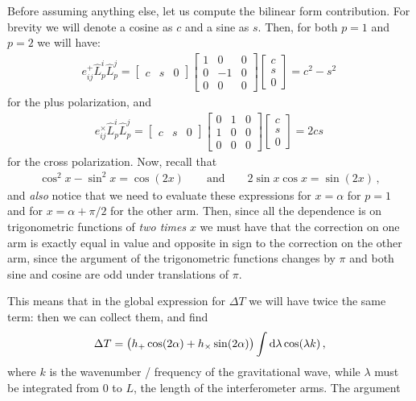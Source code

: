 \documentclass[main.tex]{subfiles}
\begin{document}
Before assuming anything else, let us compute the bilinear form contribution. For brevity we will denote a cosine as \(c\) and a sine as \(s\). Then, for both \(p =1\) and \(p=2\) we will have: 
%
\begin{align}
e_{ij}^{+} \hat{L}^{i}_{p} \hat{L}^{j}_p 
= \left[\begin{array}{ccc}
c & s & 0
\end{array}\right] 
\left[\begin{array}{ccc}
1 & 0 & 0 \\ 
0 & -1 & 0 \\ 
0 & 0 & 0
\end{array}\right] 
\left[\begin{array}{c}
c \\ 
s \\ 
0
\end{array}\right]= c^2- s^2 
\,
\end{align}
%
for the plus polarization, and 
%
\begin{align}
e_{ij}^{ \times } \hat{L}^{i}_{p} \hat{L}^{j}_p 
= \left[\begin{array}{ccc}
c & s & 0
\end{array}\right] 
\left[\begin{array}{ccc}
0 & 1 & 0 \\ 
1 & 0 & 0 \\ 
0 & 0 & 0
\end{array}\right] 
\left[\begin{array}{c}
c \\ 
s \\ 
0
\end{array}\right]= 2cs
\,
\end{align}
%
for the cross polarization. Now, recall that 
%
\begin{align}
\cos^2 x - \sin^2 x = \cos(2x) \qquad \text{and} \qquad
2 \sin x \cos x = \sin (2 x)
\,,
\end{align}
%
and \emph{also} notice that we need to evaluate these expressions for \(x = \alpha \) for \(p=1\) and for \(x = \alpha + \pi /2\) for the other arm. Then, since all the dependence is on trigonometric functions of \emph{two times} \(x\) we must have that the correction on one arm is exactly equal in value and opposite in sign to the correction on the other arm, since the argument of the trigonometric functions changes by \(\pi \) and both sine and cosine are odd under translations of \(\pi \).

This means that in the global expression for \(\Delta T\) we will have twice the same term: then we can collect them, and find 
%
\begin{align}
\Delta T = \qty(h_{+} \cos(2 \alpha ) + h_{ \times } \sin(2 \alpha )) \int \dd{\lambda } \cos(\lambda k)
\,,
\end{align}
%
where \(k\) is the wavenumber / frequency of the gravitational wave, while \(\lambda \) must be integrated from 0 to \(L\), the length of the interferometer arms. The argument 
\end{document}
